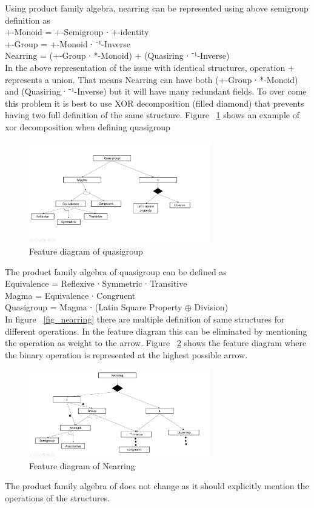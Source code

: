 Using product family algebra, nearring can be represented using above semigroup definition as \\
+-Monoid = +-Semigroup ∙ +-identity\\
+-Group = +-Monoid ∙ ⁻¹-Inverse\\
Nearring = (+-Group ∙ *-Monoid) + (Quasiring ∙ ⁻¹-Inverse)\\

In the above representation of the issue with identical structures, operation + represents a union. That means Nearring can have both (+-Group ∙ *-Monoid) and (Quasiring ∙ ⁻¹-Inverse) but it will have many redundant fields. To over come this problem it is best to use XOR decomposition (filled diamond) that prevents having two full definition of the same structure. Figure ~\ref{fig_quasigroup} shows an example of xor decomposition when defining quasigroup
 \begin{figure}[ht]
	\centering
	\includegraphics[width=0.7\textwidth]{figures/Sample/quasigroupPFA.jpg}
	\caption{Feature diagram of quasigroup}
	\label{fig_quasigroup}

\end{figure}
The product family algebra of quasigroup can be defined as \\
Equivalence = Reflexive ∙ Symmetric ∙ Transitive \\
Magma = Equivalence ∙ Congruent\\
Quasigroup = Magma ∙ (Latin Square Property \(\oplus\) Division)\\

In figure ~\ref{fig_nearring} there are multiple definition of same structures for different operations. In the feature diagram this can be eliminated by mentioning the operation as weight to the arrow. Figure ~\ref{fig_nearringArrow} shows the feature diagram where the binary operation is represented at the highest possible arrow. 
 \begin{figure}[ht]
	\centering
	\includegraphics[width=0.7\textwidth]{figures/Sample/nearringArrow.jpg}
	\caption{Feature diagram of Nearring}
	\label{fig_nearringArrow}

\end{figure}
The product family algebra of does not change as it should explicitly mention the operations of the structures. 